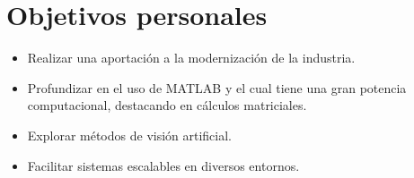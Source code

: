 \section{Objetivos personales}\label{objetivos-personales}

\begin{itemize}
    \tightlist
        \item
            Realizar una aportación a la modernización de la industria.
        \item
            Profundizar en el uso de MATLAB y el cual tiene una gran potencia computacional, destacando en cálculos matriciales.
        \item
            Explorar métodos de visión artificial.
        \item 
            Facilitar sistemas escalables en diversos entornos.
\end{itemize}